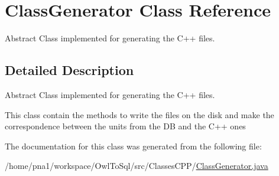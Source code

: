 \hypertarget{class_class_generator}{
\section{ClassGenerator Class Reference}
\label{class_class_generator}
}


Abstract Class implemented for generating the C++ files.  




\subsection{Detailed Description}
Abstract Class implemented for generating the C++ files. 

This class contain the methods to write the files on the disk and make the correspondence between the units from the DB and the C++ ones 

The documentation for this class was generated from the following file:\begin{DoxyCompactItemize}
\item 
/home/pna1/workspace/OwlToSql/src/ClassesCPP/\hyperlink{_class_generator_8java}{ClassGenerator.java}\end{DoxyCompactItemize}
